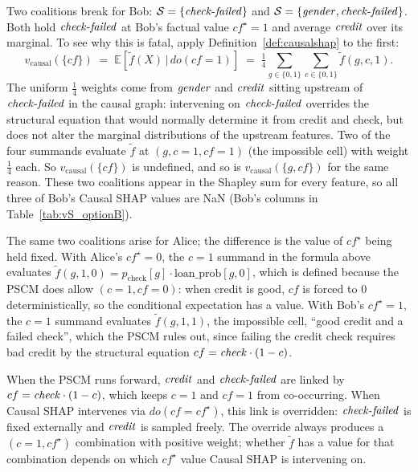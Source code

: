 Two coalitions break for Bob: $\mathcal{S}=\{\varname{check\text{-}failed}\}$ and
$\mathcal{S}=\{\varname{gender},\varname{check\text{-}failed}\}$. Both hold
$\varname{check\text{-}failed}$ at Bob's factual value $cf^\star=1$ and average
$\varname{credit}$ over its
marginal. To see why this is fatal, apply
Definition~\ref{def:causalshap} to the first:
\[
v_\mathrm{causal}(\{cf\})
\;=\; \mathbb{E}\!\left[\tilde f(X)\,\big|\,do(cf = 1)\right]
\;=\; \tfrac{1}{4}\sum_{g\in\{0,1\}}\sum_{c\in\{0,1\}}\tilde f(g,c,1).
\]
The uniform $\tfrac{1}{4}$ weights come from $\varname{gender}$ and
$\varname{credit}$ sitting upstream of $\varname{check\text{-}failed}$ in the causal graph:
intervening on $\varname{check\text{-}failed}$ overrides the structural equation that would
normally determine it
from credit and check, but does not alter the marginal distributions of the
upstream features. Two of the four summands evaluate $\tilde f$ at
$(g, c{=}1, cf{=}1)$ (the impossible cell) with weight $\tfrac{1}{4}$
each. So $v_\mathrm{causal}(\{cf\})$ is undefined, and so is
$v_\mathrm{causal}(\{g, cf\})$ for the same reason. These two coalitions
appear in the Shapley sum for every feature, so all three of Bob's Causal
SHAP values are NaN (Bob's columns in Table~\ref{tab:vS_optionB}).

The same two coalitions arise for Alice; the difference is the value of
$cf^\star$ being held fixed. With Alice's $cf^\star = 0$, the $c{=}1$ summand
in the formula above evaluates $\tilde f(g, 1, 0) =
p_\text{check}[g]\cdot\text{loan\_prob}[g, 0]$, which is defined because the
PSCM does allow $(c{=}1, cf{=}0)$: when credit is good, $cf$ is forced to $0$
deterministically, so the conditional expectation has a value. With Bob's
$cf^\star = 1$, the $c{=}1$ summand evaluates $\tilde f(g, 1, 1)$, the
impossible cell, ``good credit and a failed check'', which the PSCM
rules out, since failing the credit check requires bad credit by the
structural equation $cf = \varname{check}\cdot(1 - c)$.

When the PSCM runs forward, $\varname{credit}$ and $\varname{check\text{-}failed}$ are
linked by $cf = \varname{check}\cdot(1 - c)$, which keeps $c{=}1$ and
$cf{=}1$ from co-occurring. When Causal SHAP intervenes via
$do(cf = cf^\star)$, this link is overridden: $\varname{check\text{-}failed}$ is fixed
externally and
$\varname{credit}$ is sampled freely. The override always produces a
$(c{=}1, cf^\star)$ combination with positive weight; whether $\tilde f$ has
a value for that combination depends on which $cf^\star$ value Causal SHAP is
intervening on.

